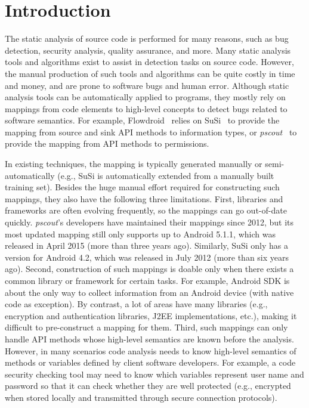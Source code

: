 \section{Introduction}

The static analysis of source code is performed for many reasons, such as bug detection, security analysis, quality assurance, and more. Many static analysis tools and algorithms exist to assist in detection tasks on source code. However, the manual production of such tools and algorithms can be quite costly in time and money, and are prone to software bugs and human error. Although static analysis tools can be automatically applied to programs, they mostly rely on mappings from code elements to high-level concepts to detect bugs related to software semantics. For example, Flowdroid~\cite{arzt2014flowdroid} relies on SuSi~\cite{rasthofer2014machine} to provide the mapping from source and sink API methods to information types, or \textit{pscout}~\cite{au2012pscout} to provide the mapping from API methods to permissions. 

In existing techniques, the mapping is typically generated manually or semi-automatically (e.g., SuSi is automatically extended from a manually built training set). Besides the huge manual effort required for constructing such mappings, they also have the following three limitations. First, libraries and frameworks are often evolving frequently, so the mappings can go out-of-date quickly. \textit{pscout}'s developers have maintained their mappings since 2012, but its most updated mapping still only supports up to Android 5.1.1, which was released in April 2015 (more than three years ago). Similarly, SuSi only has a version for Android 4.2, which was released in July 2012 (more than six years ago). Second, construction of such mappings is doable only when there exists a common library or framework for certain tasks. For example, Android SDK is about the only way to collect information from an Android device (with native code as exception). By contrast, a lot of areas have many libraries (e.g., encryption and authentication libraries, J2EE implementations, etc.), making it difficult to pre-construct a mapping for them. Third, such mappings can only handle API methods whose high-level semantics are known before the analysis. However, in many scenarios code analysis needs to know high-level semantics of methods or variables defined by client software developers. For example, a code security checking tool may need to know which variables represent user name and password so that it can check whether they are well protected (e.g., encrypted when stored locally and transmitted through secure connection protocols).

